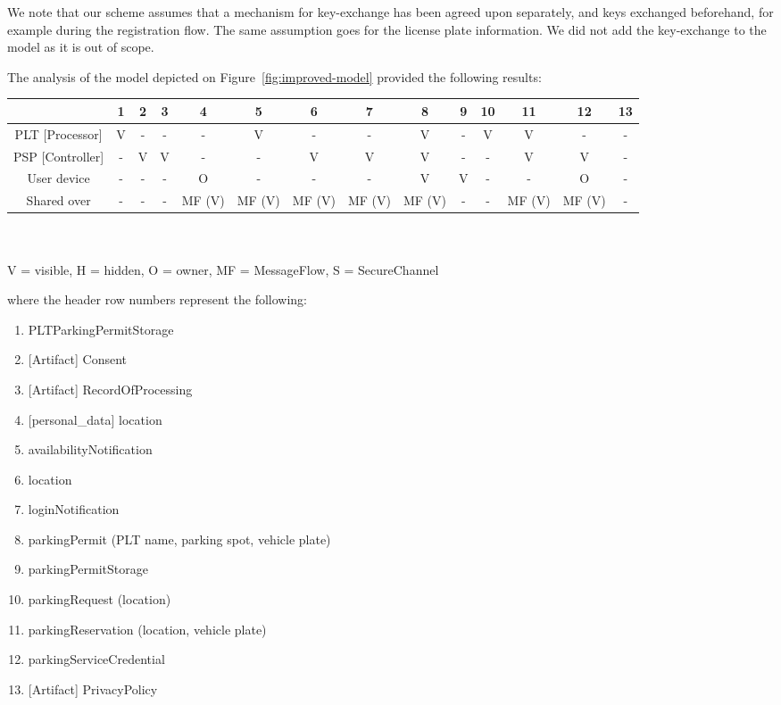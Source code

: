 We note that our scheme assumes that a mechanism for key-exchange has been
agreed upon separately, and keys exchanged beforehand, for example during the
registration flow. The same assumption goes for the license plate information.
We did not add the key-exchange to the model as it is out of scope.

The analysis of the model depicted on Figure~\ref{fig:improved-model} provided
the following results:

\begin{center}
\begin{tabular}{ |c||c|c|c|c|c|c|c|c|c|c|c|c|c| } 
    \hline
    & 1 & 2 & 3 & 4 & 5 & 6 & 7 & 8 & 9 & 10 & 11 & 12 & 13\\ 
    \hline
    \hline
    PLT [Processor] & V & - & - & - & V & - & - & V & - & V & V & - & -\\
    \hline
    PSP [Controller] & - & V & V & - & - & V & V & V & - & - & V & V & -\\
    \hline
    User device & - & - & - & O & - & - & - & V & V & - & - & O & -\\
    \hline
    \hline
    Shared over & - & - & - &
    \multicolumn{1}{m{1.2em}|}{MF (V)} &
    \multicolumn{1}{m{1.2em}|}{MF (V)} &
    \multicolumn{1}{m{1.2em}|}{MF (V)} &
    \multicolumn{1}{m{1.2em}|}{MF (V)} &
    \multicolumn{1}{m{1.2em}|}{MF (V)} &
    - & - &
    \multicolumn{1}{m{1.2em}|}{MF (V)} &
    \multicolumn{1}{m{1.2em}|}{MF (V)} & -\\
    \hline
\end{tabular}
\\~\\
V = visible, H = hidden, O = owner, MF = MessageFlow, S = SecureChannel
\end{center}
where the header row numbers represent the following:
\begin{enumerate}
    \item PLTParkingPermitStorage
    \item {[Artifact]} Consent
    \item {[Artifact]} RecordOfProcessing
    \item {[personal\_data]} location
    \item availabilityNotification
    \item location
    \item loginNotification
    \item parkingPermit (PLT name, parking spot, vehicle plate)
    \item parkingPermitStorage
    \item parkingRequest (location)
    \item parkingReservation (location, vehicle plate)
    \item parkingServiceCredential
    \item {[Artifact]} PrivacyPolicy
\end{enumerate}

